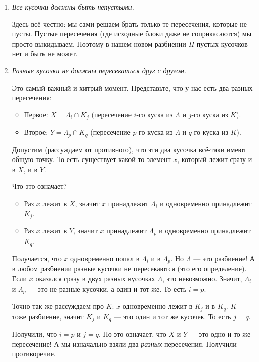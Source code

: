 \documentclass[a4paper,12pt]{article}
\begin{document}
\begin{enumerate}
	\item[\textbf{Правило 1.}] \textit{Все кусочки должны быть непустыми.}
	
	Здесь всё честно: мы сами решаем брать только те пересечения, которые не пусты. Пустые пересечения (где исходные блоки даже не соприкасаются) мы просто выкидываем. Поэтому в нашем новом разбиении $\Pi$ пустых кусочков нет и быть не может.
	
	\item[\textbf{Правило 2.}] \textit{Разные кусочки не должны пересекаться друг с другом.}
	
	Это самый важный и хитрый момент. Представьте, что у нас есть два разных пересечения:
	\begin{itemize}
		\item Первое: $X = \Lambda_i \cap K_j$ (пересечение $i$-го куска из $\Lambda$ и $j$-го куска из $K$).
		\item Второе: $Y = \Lambda_p \cap K_q$ (пересечение $p$-го куска из $\Lambda$ и $q$-го куска из $K$).
	\end{itemize}
	
	Допустим (рассуждаем от противного), что эти два кусочка всё-таки имеют общую точку. То есть существует какой-то элемент $x$, который лежит сразу и в $X$, и в $Y$.
	
	Что это означает?
	\begin{itemize}
		\item Раз $x$ лежит в $X$, значит $x$ принадлежит $\Lambda_i$ и одновременно принадлежит $K_j$.
		\item Раз $x$ лежит в $Y$, значит $x$ принадлежит $\Lambda_p$ и одновременно принадлежит $K_q$.
	\end{itemize}
	
	Получается, что $x$ одновременно попал в $\Lambda_i$ и в $\Lambda_p$. Но $\Lambda$ — это разбиение! А в любом разбиении разные кусочки не пересекаются (это его определение). Если $x$ оказался сразу в двух разных кусочках $\Lambda$, это невозможно. Значит, $\Lambda_i$ и $\Lambda_p$ — это не разные кусочки, а один и тот же. То есть $i = p$.
	
	Точно так же рассуждаем про $K$: $x$ одновременно лежит в $K_j$ и в $K_q$. $K$ — тоже разбиение, значит $K_j$ и $K_q$ — это один и тот же кусочек. То есть $j = q$.
	
	Получили, что $i = p$ и $j = q$. Но это означает, что $X$ и $Y$ — это одно и то же пересечение! А мы изначально взяли два \textit{разных} пересечения. Получили противоречие.
	

\end{enumerate}
\end{document}
